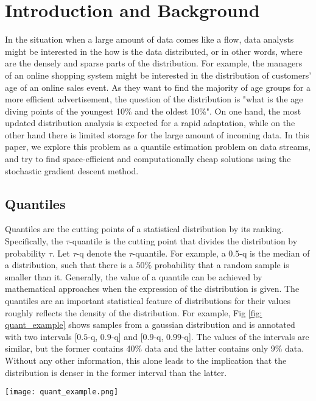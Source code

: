 \chapter{Introduction and Background}
\label{ch: intro}

\graphicspath{{Figures/Intro/}{./}} 

In the situation when a large amount of data comes like a flow, data analysts might be interested in the how is the data distributed, or in other words, where are the densely and sparse parts of the distribution. For example, the managers of an online shopping system might be interested in the distribution of customers' age of an online sales event. As they want to find the majority of age groups for a more efficient advertisement, the question of the distribution is "what is the age diving points of the youngest 10\% and the oldest 10\%".  On one hand, the most updated distribution analysis is expected for a rapid adaptation, while on the other hand there is limited storage for the large amount of incoming data. In this paper, we explore this problem as a quantile estimation problem on data streams, and try to find space-efficient and computationally cheap solutions using the stochastic gradient descent method.

\section{Quantiles}
\label{sec: intro_quant}
Quantiles are the cutting points of a statistical distribution by its ranking. Specifically, the $\tau$-quantile is the cutting point that divides the distribution by probability $\tau$. Let $\tau$-q denote the $\tau$-quantile. For example, a $0.5$-q is the median of a distribution, such that there is a $50\%$ probability that a random sample is smaller than it. Generally, the value of a quantile can be achieved by mathematical approaches when the expression of the distribution is given. 
The quantiles are an important statistical feature of distributions for their values roughly reflects the density of the distribution.
For example, Fig \ref{fig: quant_example} shows samples from a gaussian distribution and is annotated with two intervals [$0.5$-q, $0.9$-q] and [$0.9$-q, $0.99$-q]. The values of the intervals are similar, but the former contains 40\% data and the latter contains only 9\% data. Without any other information, this alone leads to the implication that the distribution is denser in the former interval than the latter.

\begin{figure*}[h!]
    \centering
	\texttt{[image: quant\_example.png]}
    \caption{Quantiles (0.5-q, 0.9-q and 0.99-q) of a dataset containing 2000 random samples from a Gaussian distribution (mean = 2, standard deviation = 18)}
    \label{fig: quant_example}
\end{figure*}

